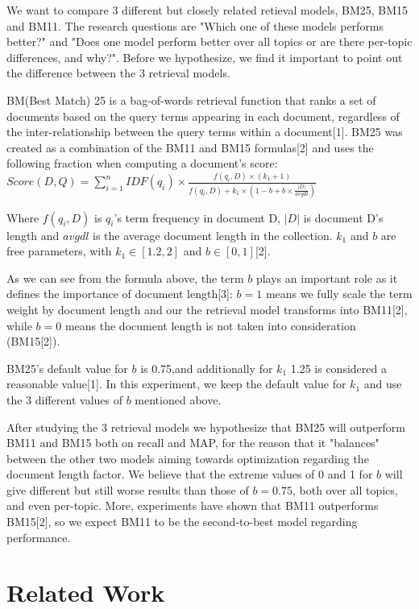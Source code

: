 \documentclass[letterpaper,11pt]{article}
\begin{document}
We want to compare 3 different but closely related retieval models, BM25, BM15 and BM11. The research questions are "Which one of these models performs better?" and "Does one model perform better over all topics or are there per-topic differences, and why?". Before we hypothesize, we find it important to point out the difference between the 3 retrieval models.

BM(Best Match) 25 is a bag-of-words retrieval function that ranks a set of documents based on the query terms appearing in each document, regardless of the inter-relationship between the query terms within a document[1]. BM25 was created as a combination of the BM11 and BM15 formulas[2] and uses the following fraction when computing a document's score:  
\newpage
$Score(D,Q) = \sum^n_{i=1}{IDF(q_i)} \times 	\frac{f(q_i,D) \times (k_1 +1)}{f(q_i,D) + k_1 \times (1-b+b\times \frac{|D|}{avgdl})}$

Where  $f(q_i,D)$ is $q_i$'s term frequency in document D, $|D|$ is document D's length and $avgdl$ is the average document length in the collection. $k_1$ and $b$ are free parameters, with $k_1 \in [1.2,2]$ and $b \in [0,1]$[2]. 



As we can see from the formula above, the term $b$ plays an important role as it defines the importance of document length[3]: $b=1$ means we fully scale the term weight by document length and our the retrieval model transforms into BM11[2], while $b=0$ means the document length is not taken into consideration (BM15[2]).

BM25's default value for $b$ is 0.75,and additionally for $k_1$ 1.25 is considered a reasonable value[1]. In this experiment, we keep the default value for $k_1$ and use the 3 different values of $b$ mentioned above.

After studying the 3 retrieval models we hypothesize that BM25 will outperform BM11 and BM15 both on recall and MAP, for the reason that it "balances" between the other two models aiming towards optimization regarding the document length factor. We believe that the extreme values of 0 and 1 for $b$ will give different but still worse results than those of $b=0.75$, both over all topics, and even per-topic. More, experiments have shown that BM11 outperforms BM15[2], so we expect BM11 to be the second-to-best model regarding performance.




\section{Related Work}
\end{document}
